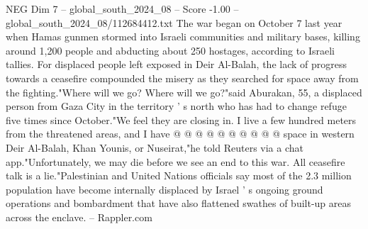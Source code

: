 \begin{textsample}{NEG Dim 7 – global\_south\_2024\_08 – Score -1.00 – global\_south\_2024\_08/112684412.txt}
The war began on October 7 last year when Hamas gunmen stormed into Israeli communities and military bases, killing around 1,200 people and abducting about 250 hostages, according to Israeli tallies.
For displaced people left exposed in Deir Al-Balah, the lack of progress towards a ceasefire compounded the misery as they searched for space away from the fighting."Where will we go?
Where will we go?"said Aburakan, 55, a displaced person from Gaza City in the territory ' s north who has had to change refuge five times since October."We feel they are closing in.
I live a few hundred meters from the threatened areas, and I have @ @ @ @ @ @ @ @ @ @ space in western Deir Al-Balah, Khan Younis, or Nuseirat,"he told Reuters via a chat app."Unfortunately, we may die before we see an end to this war.
All ceasefire talk is a lie."Palestinian and United Nations officials say most of the 2.3 million population have become internally displaced by Israel ' s ongoing ground operations and bombardment that have also flattened swathes of built-up areas across the enclave. -- Rappler.com

\end{textsample}

